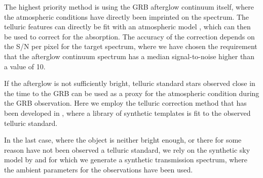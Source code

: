 \documentclass{aa}    %
\begin{document}
The highest priority method is using the GRB afterglow continuum itself, where
the atmospheric conditions have directly been imprinted on the spectrum. The
telluric features can directly be fit with an atmospheric model
\citep{Smette2015, Kausch2015}, which can then be used to correct for the
absorption. The accuracy of the correction depends on the S/N per pixel for the
target spectrum, where we have chosen the requirement that the afterglow
continuum spectrum has a median signal-to-noise higher than a value of 10.

If the afterglow is not sufficiently bright, telluric standard stars observed
close in the time to the GRB can be used as a proxy for the atmospheric
condition during the GRB observation. Here we employ the telluric correction
method that has been developed in \citet{Selsing2015}, where a library of
synthetic templates is fit to the observed telluric standard.

In the last case, where the object is neither bright enough, or there for some
reason have not been observed a telluric standard, we rely on the synthetic sky
model by \citet{Noll2012} and \citet{Jones2013} for which we generate a
synthetic transmission spectrum,  where the ambient parameters for the
observations have been used.
\end{document}
